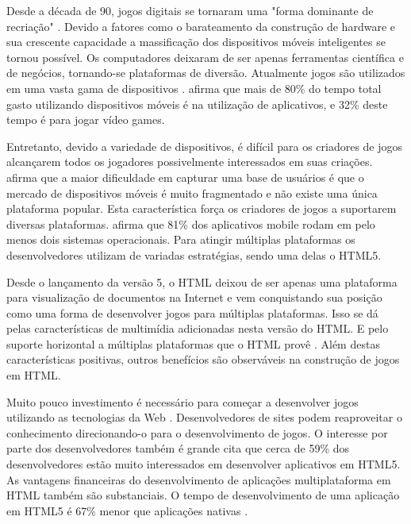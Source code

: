\setcounter{page}{11}

Desde a década de 90, jogos digitais se tornaram uma "forma dominante
de recriação" \autocite{gameDesignPatterns}. Devido a fatores
como o barateamento da construção de hardware e sua crescente
capacidade a massificação dos dispositivos móveis inteligentes
se tornou possível. Os computadores deixaram de ser apenas
ferramentas científica e de negócios, tornando-se plataformas de
diversão. Atualmente jogos são utilizados em uma vasta gama de
dispositivos \citet[p. 6]{crossPlatformMobileGameDevelopment}.
\citet{HTML5CrossPlatformGameDevelopment} afirma que mais de 80\% do
tempo total gasto utilizando dispositivos móveis é na utilização de
aplicativos, e 32\% deste tempo é para jogar vídeo games.

Entretanto, devido a variedade de dispositivos, é difícil para
os criadores de jogos alcançarem todos os jogadores possivelmente
interessados em suas criações. \citet{html5Tradeoffs} afirma que a
maior dificuldade em capturar uma base de usuários é que o mercado
de dispositivos móveis é muito fragmentado e não existe uma única
plataforma popular. Esta característica força os criadores de jogos a
suportarem diversas plataformas. \citet{htmlSurvey} afirma que 81\% dos
aplicativos mobile rodam em pelo menos dois sistemas operacionais. Para
atingir múltiplas plataformas os desenvolvedores utilizam de variadas
estratégias, sendo uma delas o HTML5.

Desde o lançamento da versão 5, o HTML deixou de ser apenas uma
plataforma para visualização de documentos na Internet e vem
conquistando sua posição como uma forma de desenvolver jogos
para múltiplas plataformas. Isso se dá pelas características de
multimídia adicionadas nesta versão do HTML. E pelo suporte horizontal
a múltiplas plataformas que o HTML provê \autocite{html5Tradeoffs}.
Além destas características positivas, outros benefícios são
observáveis na construção de jogos em HTML.

Muito pouco investimento é necessário para começar a desenvolver
jogos utilizando as tecnologias da Web \autocite{html5mostwanted}.
Desenvolvedores de sites podem reaproveitar o conhecimento
direcionando-o para o desenvolvimento de jogos. O interesse por
parte dos desenvolvedores também é grande \autocite{htmlSurvey}
cita que cerca de 59\% dos desenvolvedores estão muito interessados
em desenvolver aplicativos em HTML5. As vantagens financeiras do
desenvolvimento de aplicações multiplataforma em HTML também são
substanciais. O tempo de desenvolvimento de uma aplicação em HTML5 é
67\% menor que aplicações nativas \autocite[p. 460]{html5Tradeoffs}.


